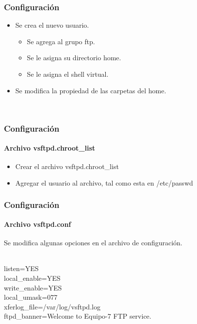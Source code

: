    \begin{frame}
     \frametitle{Configuraci\'on}
    \begin{itemize}
      \item Se crea el nuevo usuario.
      \begin{itemize}
        \item Se agrega al grupo ftp.
        \item Se le asigna su directorio home.
        \item Se le asigna el shell virtual.
      \end{itemize}
      \item Se modifica la propiedad de las carpetas del home.
    \end{itemize}
    
    \begin{shell}
      \\
    \hline\end{shell}
   \end{frame}

   \begin{frame}
     \frametitle{Configuraci\'on}
     \framesubtitle{Archivo vsftpd.chroot\_list}
     \begin{itemize}
       \item Crear el archivo vsftpd.chroot\_list
       \item Agregar el usuario al archivo, tal como esta en /etc/passwd
     \end{itemize}
    \begin{shell}
    \hline\end{shell}
   \end{frame}

  \begin{frame}
    \frametitle{Configuraci\'on}
    \framesubtitle{Archivo vsftpd.conf}
    Se modifica algunas opciones en el archivo de configuraci\'on.
    \begin{shell}\\
      listen=YES\\
      local\_enable=YES\\
      write\_enable=YES\\
      local\_umask=077\\
      xferlog\_file=/var/log/vsftpd.log\\
      ftpd\_banner=Welcome to Equipo-7 FTP service.\\ \\
    \hline\end{shell}
   \end{frame}
   
